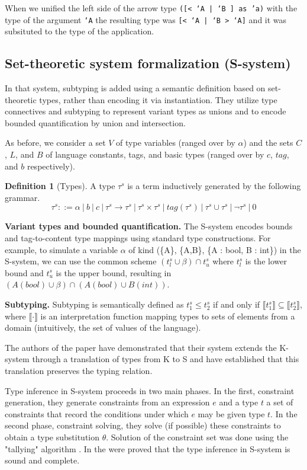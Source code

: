 \documentclass[a4paper,11pt,oneside]{article}
\theoremstyle{definition}
\newtheorem{defsec}{Definition}[section]
\begin{document}
When we unified the left side of the arrow type \texttt{([< `A | `B ] as 'a)} with the type of the argument \texttt{`A} the resulting type was \texttt{[< `A | `B > `A]} and it was subsituted to the type of the application.

\subsection{Set-theoretic system formalization (S-system)}

In that system, subtyping is added using a semantic definition
based on set-theoretic types, rather than encoding it via
instantiation. They utilize type connectives and subtyping to
represent variant types as unions and to encode bounded quantification
by union and intersection.

As before, we consider a set $V$ of type variables (ranged over by $\alpha$)
and the sets $C$, $L$, and $B$ of language constants, tags, and
basic types (ranged over by $c$, $tag$, and $b$ respectively).

\begin{defsec}[Types]
  A type $\tau^s$ is a term inductively generated by the following grammar.
  $$ \tau^s ::= \alpha\ |\ b\ |\ c\ |\ \tau^s \rightarrow \tau^s\ |\ \tau^s \times \tau^s\ |\ tag(\tau^s)\ |\ \tau^s \cup \tau^s\ |\ \neg\tau^s\ |\ 0 $$
\end{defsec}

\textbf{Variant types and bounded quantification.}
The S-system encodes bounds and tag-to-content type mappings using standard
type constructions. For example, to simulate a variable $\alpha$ of kind
(\{A\}, \{A,B\}, \{A : bool, B : int\}) in the S-system, we can use the common
scheme $(t^s_l \cup \beta) \cap t^s_u$ where $t^s_l$ is the lower bound
and $t^s_u$ is the upper bound, resulting in
$(A(bool) \cup \beta) \cap (A(bool) \cup B(int))$.

\textbf{Subtyping.}
Subtyping is semantically defined as $t^s_1 \leq t^s_2$ if and only if
$\llbracket t^s_1\rrbracket \subseteq \llbracket t^s_2\rrbracket$, where
$\llbracket\cdot\rrbracket$ is an interpretation function mapping types
to sets of elements from a domain
(intuitively, the set of values of the language).

The authors of the paper have demonstrated that their system extends the K-system through a translation of types from K to S and have established that this translation preserves the typing relation.

Type inference in S-system proceeds in two main phases.
In the first, constraint generation, they generate constraints from an expression $e$ and a type $t$ a set of constraints that record the conditions under which $e$ may be given type $t$.
In the second phase, constraint solving, they solve (if possible) these constraints to obtain a type substitution $\theta$.
Solution of the constraint set was done using the "tallying" algorithm \cite{Castagna_2015}.
In the \cite{Castagna_2016} were proved that the type inference in S-system is sound and complete.
\end{document}
